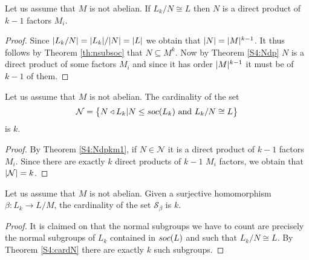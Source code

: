 \begin{theorem}
    \label{S4:Ndpkm1}
    Let us assume that $M$ is not abelian. If $L_k/N \cong L$ then $N$ is a direct product of $k-1$ factors $M_i$.
\end{theorem}

\begin{proof}
    Since $| L_k/N | = | L_k | / | N | = | L |$ we obtain that $| N | = | M |^{k-1}$. It thus follows by Theorem \ref{th:nsubsoc} that $N \subseteq M^k$. Now by Theorem \ref{S4:Ndp} $N$ is a direct product of some factors $M_i$ and since it has order $| M |^{k-1}$ it must be of $k-1$ of them. 
\end{proof}

\begin{theorem}
    \label{S4:cardN}
    Let us assume that $M$ is not abelian. The cardinality of the set 
    $$
    \mathcal{N} = \left\{N \triangleleft L_k | N \le soc {(L_k)} \text{ and } L_k /N \cong L \right\}
    $$ is $k$.
\end{theorem}

\begin{proof}
    By Theorem \ref{S4:Ndpkm1}, if $N \in \mathcal{N}$ it is a direct product of $k-1$ factors $M_i$. Since there are exactly $k$ direct products of $k-1$ $M_i$ factors, we obtain that $| \mathcal{N} | = k$.
\end{proof}

\begin{theorem}
    \label{cardS}
    Let us assume that $M$ is not abelian. Given a surjective homomorphism $\beta \colon L_k \rightarrow L/M$, the cardinality of the set $\mathscr{S}_\beta$ is $k$.
\end{theorem}

\begin{proof}
    It is claimed on \cite[Lemma 2.5]{DallaVoltaFGNMGAPQ} that the normal subgroups we have to count are precisely the normal subgroups of $L_k$ contained in $soc {(L)}$ and such that $L_k/N \cong L$. By Theorem \ref{S4:cardN} there are exactly $k$ such subgroups.
    
    
\end{proof}